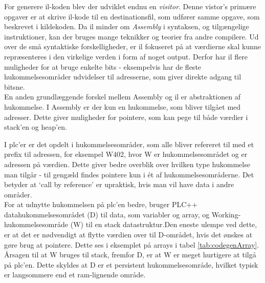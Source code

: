 For generere \gls{il}-koden blev der udviklet endnu en \textit{visitor}. Denne vistor's primære opgaver er at skrive \gls{il}-kode til en destinationsfil, som udfører samme opgave, som beskrevet i kildekoden. Da \gls{il} minder om \textit{Assembly} i syntaksen, og tilgængelige instruktioner, kan der bruges mange teknikker og teorier fra andre compilere. Ud over de små syntaktiske forskelligheder, er \gls{il} fokuseret på at værdierne skal kunne repræsenteres i den virkelige verden i form af noget output. Derfor har \gls{il} flere muligheder for at bruge enkelte bits - eksempelvis har de fleste hukommelsesområder udvidelser til adresserne, som giver direkte adgang til bitsne. \\

\noindent En anden grundlæggende forskel mellem Assembly og \gls{il} er abstraktionen af hukommelse. I Assembly er der kun en hukommelse, som bliver tilgået med adresser. Dette giver muligheder for pointere, som kan pege til både værdier i stack'en og heap'en.

\noindent I \gls{plc}'er er det opdelt i hukommelsesområder, som alle bliver refereret til med et prefix til adressen, for eksempel {\ttfamily W402}, hvor {\ttfamily W} er hukommelsesområdet og {} er adressen på værdien. Dette giver bedre overblik over hvilken type hukommelse man tilgår - til gengæld findes pointere kun i ét af hukommelsesområderne. Det betyder at \enquote*{call by reference} er upraktisk, hvis man vil have data i andre områder.\\

\noindent For at udnytte hukommelsen på \gls{plc}'en bedre, bruger PLC++ datahukommelsesområdet ({\ttfamily D}) til data, som variabler og array, og Working-hukommelsesområde ({\ttfamily W}) til en stack datastruktur.Den eneste ulempe ved dette, er at det er nødvendigt at flytte værdien over til {\ttfamily D}-området, hvis det ønskes at gøre brug at pointere. Dette ses i eksemplet på arrays i tabel \ref{tab:codegenArray}. Årsagen til at {\ttfamily W} bruges til stack, fremfor {\ttfamily D}, er at {\ttfamily W} er meget hurtigere at tilgå på \gls{plc}'en. Dette skyldes at {\ttfamily D} er et persistent hukommelsesområde, hvilket typisk er langsommere end et ram-lignende område.